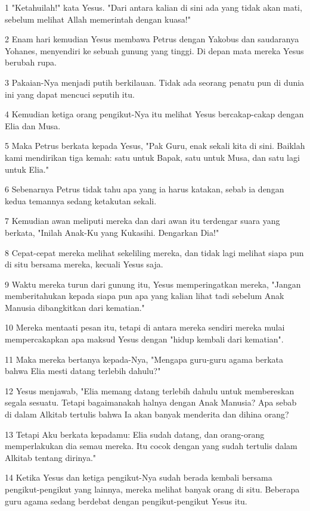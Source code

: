 \par 1 "Ketahuilah!" kata Yesus. "Dari antara kalian di sini ada yang tidak akan mati, sebelum melihat Allah memerintah dengan kuasa!"
\par 2 Enam hari kemudian Yesus membawa Petrus dengan Yakobus dan saudaranya Yohanes, menyendiri ke sebuah gunung yang tinggi. Di depan mata mereka Yesus berubah rupa.
\par 3 Pakaian-Nya menjadi putih berkilauan. Tidak ada seorang penatu pun di dunia ini yang dapat mencuci seputih itu.
\par 4 Kemudian ketiga orang pengikut-Nya itu melihat Yesus bercakap-cakap dengan Elia dan Musa.
\par 5 Maka Petrus berkata kepada Yesus, "Pak Guru, enak sekali kita di sini. Baiklah kami mendirikan tiga kemah: satu untuk Bapak, satu untuk Musa, dan satu lagi untuk Elia."
\par 6 Sebenarnya Petrus tidak tahu apa yang ia harus katakan, sebab ia dengan kedua temannya sedang ketakutan sekali.
\par 7 Kemudian awan meliputi mereka dan dari awan itu terdengar suara yang berkata, "Inilah Anak-Ku yang Kukasihi. Dengarkan Dia!"
\par 8 Cepat-cepat mereka melihat sekeliling mereka, dan tidak lagi melihat siapa pun di situ bersama mereka, kecuali Yesus saja.
\par 9 Waktu mereka turun dari gunung itu, Yesus memperingatkan mereka, "Jangan memberitahukan kepada siapa pun apa yang kalian lihat tadi sebelum Anak Manusia dibangkitkan dari kematian."
\par 10 Mereka mentaati pesan itu, tetapi di antara mereka sendiri mereka mulai mempercakapkan apa maksud Yesus dengan "hidup kembali dari kematian".
\par 11 Maka mereka bertanya kepada-Nya, "Mengapa guru-guru agama berkata bahwa Elia mesti datang terlebih dahulu?"
\par 12 Yesus menjawab, "Elia memang datang terlebih dahulu untuk membereskan segala sesuatu. Tetapi bagaimanakah halnya dengan Anak Manusia? Apa sebab di dalam Alkitab tertulis bahwa Ia akan banyak menderita dan dihina orang?
\par 13 Tetapi Aku berkata kepadamu: Elia sudah datang, dan orang-orang memperlakukan dia semau mereka. Itu cocok dengan yang sudah tertulis dalam Alkitab tentang dirinya."
\par 14 Ketika Yesus dan ketiga pengikut-Nya sudah berada kembali bersama pengikut-pengikut yang lainnya, mereka melihat banyak orang di situ. Beberapa guru agama sedang berdebat dengan pengikut-pengikut Yesus itu.
